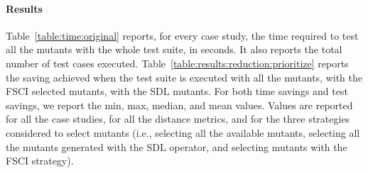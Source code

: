 
%
%











\paragraph{Results}

Table~\ref{table:time:original} reports, for every case study, the time required to test all the mutants with the whole test suite, in seconds. It also reports  the total number of test cases executed. 
Table~\ref{table:results:reduction:prioritize} reports the saving achieved when the \APPR test suite is executed with all the mutants, with the FSCI selected mutants, with the SDL mutants. For both time savings and test savings, we report the min, max, median, and mean values. Values are reported for all the case studies, for all the distance metrics, and for the three strategies considered to select mutants (i.e., selecting all the available mutants, selecting all the mutants generated with the SDL operator, and selecting mutants with the FSCI strategy).

